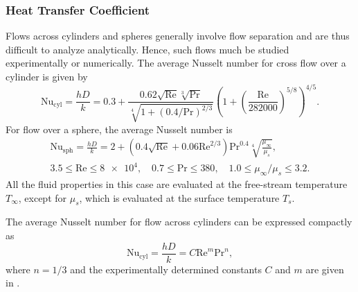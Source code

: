 \subsubsection{Heat Transfer Coefficient}
Flows across cylinders and spheres generally involve flow separation and are thus difficult to analyze analytically.
Hence, such flows much be studied experimentally or numerically.
The average Nusselt number for cross flow over a cylinder is given by 
\begin{equation*}
  \mathrm{Nu}_{\mathrm{cyl}} = \frac{h D}{k} = \num{0,3} + \frac{\num{0,62} \sqrt{\mathrm{Re}} \sqrt[3]{\mathrm{Pr}}}{\sqrt[4]{1 + \left( \num{0,4} / \mathrm{Pr} \right)^{2 / 3}}} \left( 1 + \left( \frac{\mathrm{Re}}{\num{282000}} \right)^{5 / 8} \right)^{4 / 5}
.\end{equation*}
For flow over a sphere, the average Nusselt number is 
\begin{gather*}
  \mathrm{Nu}_{\mathrm{sph}} = \frac{h D}{k} = 2 + \left( \num{0,4} \sqrt{\mathrm{Re}} + \num{0,06} \mathrm{Re}^{2 / 3} \right) \mathrm{Pr}^{\num{0,4}} \sqrt[4]{\frac{\mu_{\infty}}{\mu_s}}, \\
  \num{3,5} \leq \mathrm{Re} \leq \num{8e4}, \quad \num{0,7} \leq \mathrm{Pr} \leq \num{380}, \quad \num{1,0} \leq \mu_{\infty} / \mu_s \leq \num{3,2}
.\end{gather*}
All the fluid properties in this case are evaluated at the free-stream temperature $T_{\infty}$, except for $\mu_s$, which is evaluated at the surface temperature $T_s$.

The average Nusselt number for flow across cylinders can be expressed compactly as 
\begin{equation*}
  \mathrm{Nu}_{\mathrm{cyl}} = \frac{h D}{k} = C \mathrm{Re}^{m} \mathrm{Pr}^{n}
,\end{equation*}
where $n = 1 / 3$ and the experimentally determined constants $C$ and $m$ are given in  .

